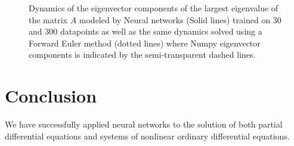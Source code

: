 \documentclass[reprint, english, nofootinbib]{revtex4-2}
\begin{document}
\begin{figure}[h!tb]
   \caption{\label{fig:eigenvector} Dynamics of the eigenvector components of the largest eigenvalue of the matrix $A$ modeled by Neural networks (Solid lines) trained on 30 and 300 datapoints as well as the same dynamics solved using a Forward Euler method (dotted lines) where Numpy eigenvector components is indicated by the semi-transparent dashed lines.}
\end{figure}


\section{Conclusion}

We have successfully applied neural networks to the solution of both partial differential equations and systems of nonlinear ordinary differential equations.


\onecolumngrid

\twocolumngrid
\end{document}
